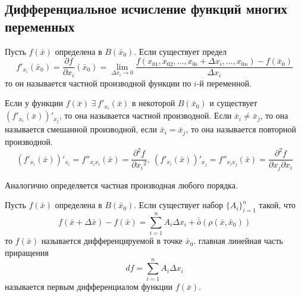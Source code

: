\subsection{Дифференциальное исчисление функций многих переменных}
\begin{definition}
    Пусть $f(\bar{x})$ определена в $B(\bar{x}_0)$. Если существует предел
    \[f'_{x_i}(\bar{x}_0)=\frac{\partial {f}}{\partial {x_i}}(\bar{x}_0)=\lim\limits_{\Delta x_i\to 0}\frac{f(x_{01}, x_{02}, \dots, x_{0i}+\Delta x_i, \dots, x_{0n})-f(\bar{x}_0)}{\Delta x_i}\]
    то он называется частной производной функции по $i$-й переменной.
\end{definition} 
\begin{definition}
    Если у функции $f(\bar{x})\ \exists\ f'_{x_i}(\bar{x})$ в некоторой $B(\bar{x}_0)$ и существует $(f'_{x_i}(\bar{x}))'_{x_j}$, то она называется частной производной. Если $\bar{x}_i\ne \bar{x}_j$, то она называется смешанной производной, если $\bar{x}_i=\bar{x}_j$, то она называется повторной производной.
    \[(f'_{x_i}(\bar{x}))'_{x_i}=f''_{x_i x_i}(\bar{x})=\frac{\partial^2 {f}}{\partial {x_i}^2},\ (f'_{x_i}(\bar{x}))'_{x_j}=f''_{x_i x_j}(\bar{x})=\frac{\partial^2 {f}}{\partial {x_j}\partial {x_i}}\]
\end{definition} 
\begin{comm}
    Аналогично определяется частная производная любого порядка.
\end{comm}
\begin{definition}
    Пусть $f(\bar{x})$ определена в $B(\bar{x}_0)$. Если существует набор $\{A_i\}_{i=1}^n$ такой, что
    \[f(\bar{x}+\Delta \bar{x})-f(\bar{x})=\sum\limits_{i=1}^{n}A_i \Delta x_i +\bar{\bar{o}}{(\rho(\bar{x}, \bar{x}_0))}\]
    то $f(\bar{x})$ называется дифференцируемой в точке $\bar{x}_0$. главная линейная часть приращения 
    \[df=\sum\limits_{i=1}^{n}A_i \Delta x_i\]
    называется первым дифференциалом функции $f(\bar{x})$.
\end{definition} 

